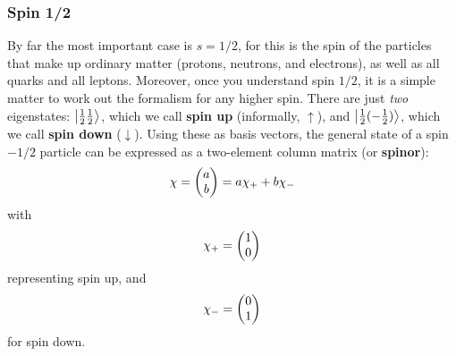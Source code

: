 \subsubsection{Spin 1/2}
By far the most important case is $s=1/2$, for this is the spin of the particles that make up ordinary matter (protons, neutrons, and electrons), as well as all quarks and all leptons. Moreover, once you understand spin $1/2$, it is a simple matter to work out the formalism for any higher spin. There are just \textit{two} eigenstates: $\ket{\frac{1}{2}\frac{1}{2}}$, which we call \textbf{spin up} (informally, $\uparrow$), and $\ket{\frac{1}{2}(-\frac{1}{2})}$, which we call \textbf{spin down} ($\downarrow$). Using these as basis vectors, the general state of a spin $-1/2$ particle can be expressed as a two-element column matrix (or \textbf{spinor}):
\begin{equation}\label{4.139}
	\chi=\mqty(a\\b)=a\chi_++b\chi_-
\end{equation}
with
\begin{equation}\label{4.140}
	\chi_+=\mqty(1\\0)
\end{equation}
representing spin up, and
\begin{equation}\label{4.141}
	\chi_-=\mqty(0\\1)
\end{equation}
for spin down.

